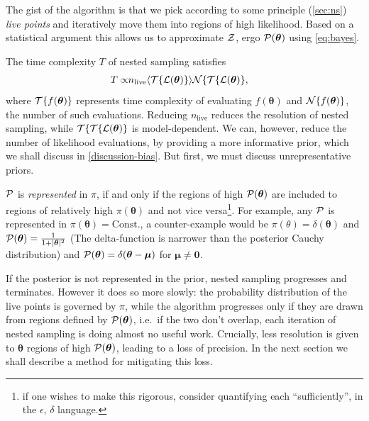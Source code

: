 \documentclass[usenatbib]{mnras}
\begin{document}
The gist of the algorithm \citep{Skilling} is that we pick according
to some principle (\cref{sec:ns}) \emph{live points} and iteratively
move them into regions of high likelihood. Based on a statistical
argument this allows us to approximate ${\cal Z}$, ergo
${\cal P}(\bm{\theta})$ using \cref{eq:bayes}.

The time complexity $T$ of nested sampling satisfies
\begin{subequations}\label{eq:complexity}
  \begin{align}
    T \propto & n_\text{live} \langle {\cal T}\{{\cal L}(\bm{\theta})\} \rangle {\cal N}\{{\cal T}\{{\cal L}(\bm{\theta}) \},
  \end{align}
\end{subequations}
where ${\cal T}\{f(\bm{\theta})\}$ represents time complexity of
evaluating $f(\bm{\theta})$ and ${\cal N}\{f(\bm{\theta})\}$, the
number of such evaluations. Reducing $n_\text{live}$ reduces the
resolution of nested sampling, while
${\cal T}\{ {\cal T}\{{\cal L}(\bm{\theta})\}$ is model-dependent. We
can, however, reduce the number of likelihood evaluations, by
providing a more informative prior, which we shall discuss in
\cref{discussion-bias}. But first, we must discuss unrepresentative
priors.

${\cal P}$ is \emph{represented} in $\pi$, if and only if the regions
of high ${\cal P}(\bm{\theta})$ are included to regions of relatively
high $\pi(\bm{\theta})$ and not vice versa\footnote{if one wishes to
  make this rigorous, consider quantifying each ``sufficiently'', in
  the $\epsilon$, $\delta$ language. }. For example, any ${\cal P}$ is
represented in $\pi(\bm{\theta}) = \text{Const.}$, a counter-example
would be $\pi(\theta) = \delta(\bm{\theta})$ and
${\cal P}(\bm{\theta}) = \frac{1}{1 + |\bm{\theta}|^{2}}$ (The
delta-function is narrower than the posterior Cauchy distribution) and
${\cal P}(\bm{\theta}) = \delta(\bm{\theta} - \bm{\mu})$ for
$\bm{\mu} \ne \bm{0}$.

If the posterior is not represented in the prior, nested sampling
progresses and terminates. However it does so more slowly: the
probability distribution of the live points is governed by $\pi$,
while the algorithm progresses only if they are drawn from regions
defined by \( {\cal P} (\bm{\theta})\), i.e.~if the two don't overlap,
each iteration of nested sampling is doing almost no useful
work. Crucially, less resolution is given to $\bm{\theta}$ regions of
high \( {\cal P} (\bm{\theta})\), leading to a loss of precision. In
the next section we shall describe a method for mitigating this loss.
\end{document}
